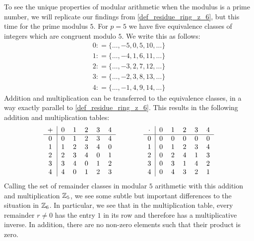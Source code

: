 \begin{example} 
\label{primfield_z_5}
To see the unique properties of modular arithmetic when the modulus is a prime number, we will replicate our findings from \examplename{} \ref{def_residue_ring_z_6}, but this time for the prime modulus $5$.
For $ p = 5 $ we have five equivalence classes of integers which are congruent modulo $ 5 $. We write this as follows:
$$
\begin{array}{ccc}
0: = \{\ldots, -5,0,5,10, \ldots \}\\
1: = \{\ldots, -4,1,6,11, \ldots \}\\
2: = \{\ldots, -3,2,7,12, \ldots \} \\
3: = \{\ldots, -2,3,8,13, \ldots \}\\
4: = \{\ldots, -1,4,9,14, \ldots \}
\end{array}
$$
Addition and multiplication can be transferred to the equivalence classes, in a way exactly parallel to \examplename{} \ref{def_residue_ring_z_6}. This results in the following addition and multiplication tables:
\begin{equation}\label{Z5_tables}
  \begin{tabular}{c | c c c c c}
    + & 0 & 1 & 2 & 3 & 4 \\\hline
    0 & 0 & 1 & 2 & 3 & 4 \\
    1 & 1 & 2 & 3 & 4 & 0 \\
    2 & 2 & 3 & 4 & 0 & 1 \\
    3 & 3 & 4 & 0 & 1 & 2 \\
    4 & 4 & 0 & 1 & 2 & 3 \\
  \end{tabular} \quad \quad \quad \quad
  \begin{tabular}{c | c c c c c}
$ \cdot $ & 0 & 1 & 2 & 3 & 4 \\\hline
      0 & 0 & 0 & 0 & 0 & 0 \\
      1 & 0 & 1 & 2 & 3 & 4 \\
      2 & 0 & 2 & 4 & 1 & 3 \\
      3 & 0 & 3 & 1 & 4 & 2 \\
      4 & 0 & 4 & 3 & 2 & 1 \\
  \end{tabular}
\end{equation}
Calling the set of remainder classes in modular $5$ arithmetic with this addition and multiplication $\mathbb{Z}_5$, we see some subtle but important differences to the situation in $\mathbb{Z}_6$. In particular, we see that in the multiplication table, every remainder $r\neq 0$ has the entry $1$ in its row and therefore has a multiplicative inverse. In addition, there are no non-zero elements such that their product is zero.


\end{example}
